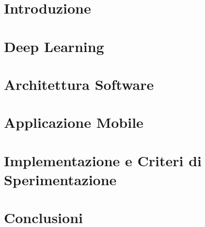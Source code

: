 \documentclass[12pt, twoside, openright]{report}
\begin{document}
\tableofcontents


\chapter{Introduzione}


\chapter{Deep Learning}


\chapter{Architettura Software}\label{cap:architecture}


\chapter{Applicazione Mobile}\label{cap:gui}


\chapter{Implementazione e Criteri di Sperimentazione}


\chapter{Conclusioni}


\appendix%



\printbibliography%
\end{document}
